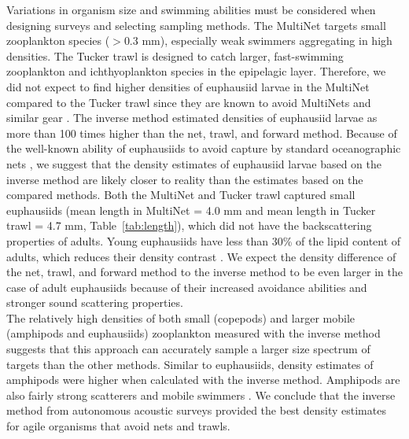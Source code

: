 Variations in organism size and swimming abilities must be considered when designing surveys and selecting sampling methods. The MultiNet targets small zooplankton species ($>$0.3 mm), especially weak swimmers aggregating in high densities. The Tucker trawl is designed to catch larger, fast-swimming zooplankton and ichthyoplankton species in the epipelagic layer. Therefore, we did not expect to find higher densities of euphausiid larvae in the MultiNet compared to the Tucker trawl since they are known to avoid MultiNets and similar gear \citep{Brinton1967, Greenlaw1979}. The inverse method estimated densities of euphausiid larvae as more than 100 times higher than the net, trawl, and forward method. Because of the well-known ability of euphausiids to avoid capture by standard oceanographic nets \citep{Wiebe1982}, we suggest that the density estimates of euphausiid larvae based on the inverse method are likely closer to reality than the estimates based on the compared methods. Both the MultiNet and Tucker trawl captured small euphausiids (mean length in MultiNet = 4.0 mm and mean length in Tucker trawl = 4.7 mm, Table~\ref{tab:length}), which did not have the backscattering properties of adults. Young euphausiids have less than 30\% of the lipid content of adults, which reduces their density contrast \citep{Kogeler1987}. We expect the density difference of the net, trawl, and forward method to the inverse method to be even larger in the case of adult euphausiids because of their increased avoidance abilities and stronger sound scattering properties.\\
The relatively high densities of both small (copepods) and larger mobile (amphipods and euphausiids) zooplankton measured with the inverse method suggests that this approach can accurately sample a larger size spectrum of targets than the other methods. Similar to euphausiids, density estimates of amphipods were higher when calculated with the inverse method. Amphipods are also fairly strong scatterers and mobile swimmers \citep{Skjoldal2013}. We conclude that the inverse method from autonomous acoustic surveys provided the best density estimates for agile organisms that avoid nets and trawls. \\
